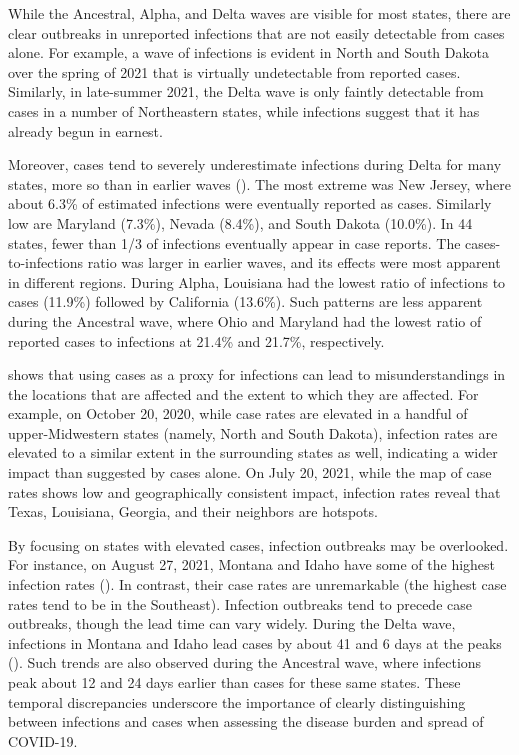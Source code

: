 While the Ancestral, Alpha, and Delta waves are visible for most states, there
are clear outbreaks in unreported infections that are not easily detectable from
cases alone. For example, a wave of infections is evident in North and South
Dakota over the spring of 2021 that is virtually undetectable from reported
cases. Similarly, in late-summer 2021, the Delta wave is only faintly
detectable from cases in a number of Northeastern states, while infections
suggest that it has already begun in earnest.  

Moreover, cases tend to severely underestimate infections during Delta for many
states, more so than in earlier waves (). The most
extreme was New Jersey, where about 6.3\% of estimated infections were
eventually reported as cases. Similarly low are Maryland (7.3\%), Nevada
(8.4\%), and South Dakota (10.0\%). In 44 states, fewer than 1/3 of infections
eventually appear in case reports. The cases-to-infections ratio was larger in
earlier waves, and its effects were most apparent in different regions. During
Alpha, Louisiana had the lowest ratio of infections to cases (11.9\%) followed
by California (13.6\%). Such patterns are less apparent during the Ancestral
wave, where Ohio and Maryland had the lowest ratio of reported cases to
infections at 21.4\% and 21.7\%, respectively. 

 shows that using cases as a proxy for infections
can lead to misunderstandings in the locations that are affected and the extent
to which they are affected. For example, on October 20, 2020, while case rates
are elevated in a handful of upper-Midwestern states (namely, North and South
Dakota), infection rates are elevated to a similar extent in the surrounding
states as well, indicating a wider impact than suggested by cases alone. On July
20, 2021, while the map of case rates shows low and geographically consistent
impact, infection rates reveal that Texas, Louisiana, Georgia, and their
neighbors are hotspots. 
 
By focusing on states with elevated cases, infection outbreaks may be
overlooked. For instance, on August 27, 2021, Montana and Idaho have some of the
highest infection rates (). In contrast, their
case rates are unremarkable (the highest case rates tend to be in the
Southeast). Infection outbreaks tend to precede case outbreaks, though the lead
time can vary widely. During the Delta wave, infections in Montana and Idaho lead
cases by about 41 and 6 days at the peaks (). Such
trends are also observed during the Ancestral wave, where infections peak about
12 and 24 days earlier than cases for these same states.  These temporal
discrepancies underscore the importance of clearly distinguishing between
infections and cases when assessing the disease burden and spread of COVID-19.

